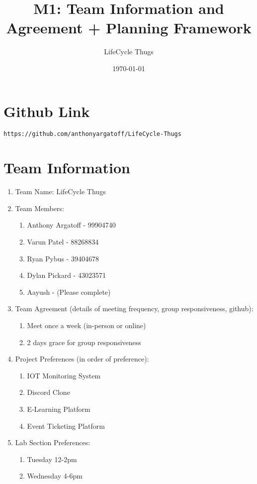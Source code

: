 \documentclass{article}
\title{M1: Team Information and Agreement + Planning Framework}
\author{LifeCycle Thugs}
\date{\today}
\begin{document}
\maketitle

\section*{Github Link}
\begin{verbatim}
https://github.com/anthonyargatoff/LifeCycle-Thugs
\end{verbatim}

\section*{Team Information}
\begin{enumerate}
    \item Team Name: LifeCycle Thugs
    \item Team Members:
        \begin{enumerate}
            \item Anthony Argatoff - 99904740
            \item Varun Patel - 88268834
            \item Ryan Pybus - 39404678
            \item Dylan Pickard - 43023571
            \item Aayush - (Please complete)
        \end{enumerate}
    \item Team Agreement (details of meeting frequency, group responsiveness, github):
        \begin{enumerate}
            \item Meet once a week (in-person or online)
            \item 2 days grace for group responsiveness
        \end{enumerate}
    \item Project Preferences (in order of preference):
        \begin{enumerate}
            \item IOT Monitoring System
            \item Discord Clone
            \item E-Learning Platform
            \item Event Ticketing Platform
        \end{enumerate}
    \item Lab Section Preferences:
        \begin{enumerate}
            \item Tuesday 12-2pm
            \item Wednesday 4-6pm
        \end{enumerate}
\end{enumerate}
\end{document}
